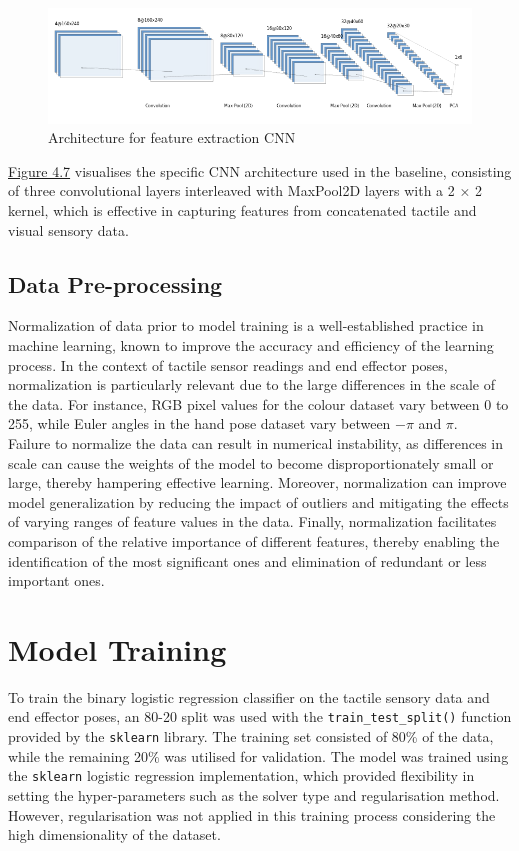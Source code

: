 \documentclass[11pt, a4paper]{report}
\begin{document}
\begin{figure}[H]
    \includegraphics[scale=0.7]{docs/Project Report/Media/nn.png}
    \caption{Architecture for feature extraction CNN}
    \label{fig:4.7}
\end{figure}

\hyperref[fig:4.7]{Figure 4.7} visualises the specific CNN architecture used in the baseline, consisting of three convolutional layers interleaved with MaxPool2D layers with a 2 × 2 kernel, which is effective in capturing features from concatenated tactile and visual sensory data. 


\subsection{Data Pre-processing}
\label{sec:4.4.3}
Normalization of data prior to model training is a well-established practice in machine learning, known to improve the accuracy and efficiency of the learning process. In the context of tactile sensor readings and end effector poses, normalization is particularly relevant due to the large differences in the scale of the data. For instance, RGB pixel values for the colour dataset vary between 0 to 255, while Euler angles in the hand pose dataset vary between $-\pi$ and $\pi$.\\

Failure to normalize the data can result in numerical instability, as differences in scale can cause the weights of the model to become disproportionately small or large, thereby hampering effective learning. Moreover, normalization can improve model generalization by reducing the impact of outliers and mitigating the effects of varying ranges of feature values in the data. Finally, normalization facilitates comparison of the relative importance of different features, thereby enabling the identification of the most significant ones and elimination of redundant or less important ones.


\section{Model Training}
\label{sec:4.5}
To train the binary logistic regression classifier on the tactile sensory data and end effector poses, an 80-20 split was used with the \verb|train_test_split()| function provided by the \verb|sklearn| library. The training set consisted of 80\% of the data, while the remaining 20\% was utilised for validation. The model was trained using the \verb|sklearn| logistic regression implementation, which provided flexibility in setting the hyper-parameters such as the solver type and regularisation method. However, regularisation was not applied in this training process considering the high dimensionality of the dataset.\\
\end{document}
